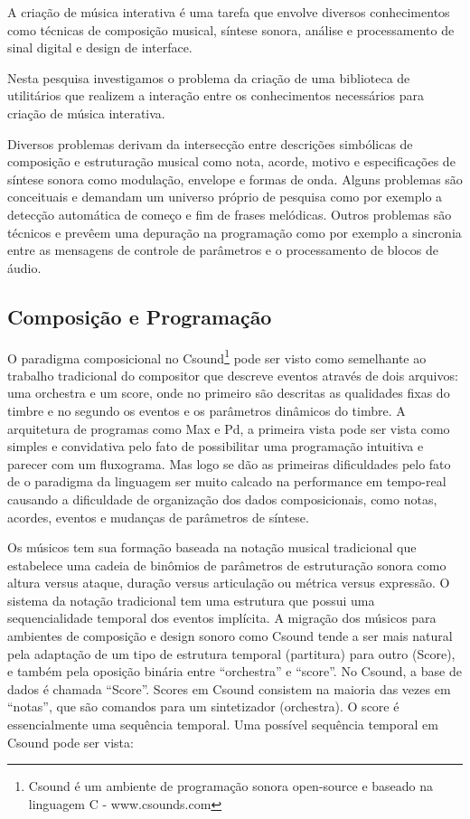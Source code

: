 \documentclass{ppgmus}
\begin{document}
A criação de música interativa é uma tarefa que envolve diversos 
conhecimentos como técnicas de composição musical, síntese sonora,
análise e processamento de sinal digital e design de interface.

Nesta pesquisa investigamos o problema da criação de uma biblioteca
de utilitários que realizem a interação entre os conhecimentos necessários
para criação de música interativa.


Diversos problemas derivam da intersecção entre descrições simbólicas
de composição e estruturação musical como nota, acorde, motivo e 
especificações de síntese sonora como modulação, envelope e formas de onda.
Alguns problemas são conceituais e demandam um universo próprio de 
pesquisa como por exemplo a detecção automática de começo e fim de
frases melódicas. Outros problemas são técnicos e prevêem uma depuração
na programação como por exemplo a sincronia entre as mensagens de controle de parâmetros
e o processamento de blocos de áudio. 



\subsection{Composição e Programação}
  
O paradigma composicional no Csound\footnote{Csound é um ambiente de programação
sonora open-source e baseado na linguagem C - www.csounds.com} pode ser visto como semelhante ao
trabalho tradicional do compositor que descreve eventos através de
dois arquivos: uma orchestra e um score, onde no primeiro são
descritas as qualidades fixas do timbre e no segundo os eventos e os
parâmetros dinâmicos do timbre. A arquitetura de programas como Max e
Pd, a primeira vista pode ser vista como simples e convidativa pelo
fato de possibilitar uma programação intuitiva e parecer com um
fluxograma. Mas logo se dão as primeiras dificuldades pelo fato de o
paradigma da linguagem ser muito calcado na performance em tempo-real
causando a dificuldade de organização dos dados composicionais, como
notas, acordes, eventos e mudanças de parâmetros de síntese.

Os músicos tem sua formação baseada na notação musical tradicional que
estabelece uma cadeia de binômios de parâmetros de estruturação sonora
\cite{zampronha00:notacao} como altura versus ataque, duração versus
articulação ou métrica versus expressão. O sistema da notação
tradicional tem uma estrutura que possui uma sequencialidade temporal
dos eventos implícita. A migração dos músicos para ambientes de
composição e design sonoro como Csound \cite{boulanger00:csound} tende
a ser mais natural pela adaptação de um tipo de estrutura temporal
(partitura) para outro (Score), e também pela oposição binária entre
``orchestra'' e ``score''. No Csound, a base de dados é chamada
``Score''. Scores em Csound consistem na maioria das vezes em
``notas'', que são comandos para um sintetizador (orchestra). O score
é essencialmente uma sequência temporal. Uma possível sequência
temporal em Csound pode ser vista:
\end{document}

